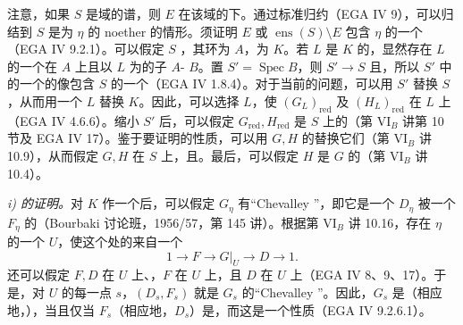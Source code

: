 注意，如果 $S$ 是域的谱，则 $E$ 在该域的下。通过标准归约（EGA IV 9），可以归结到 $S$ 是为 $\eta$ 的 noether 的情形。须证明 $E$ 或 $\operatorname{ens}(S)\setminus E$ 包含 $\eta$ 的一个（EGA IV 9.2.1）。可以假定 $S$ ，其环为 $A$，为 $K$。若 $L$ 是 $K$ 的，显然存在 $L$ 的一个在 $A$ 上且以 $L$ 为的子 $A$- $B$。置 $S'=\operatorname{Spec}B$，则 $S'\to S$ 且，所以 $S'$ 中的一个的像包含 $S$ 的一个（EGA IV 1.8.4）。对于当前的问题，可以用 $S'$ 替换 $S$，从而用一个 $L$ 替换 $K$。因此，可以选择 $L$，使 $(G_L)_{\mathrm{red}}$ 及 $(H_L)_{\mathrm{red}}$ 在 $L$ 上（EGA IV 4.6.6）。缩小 $S'$ 后，可以假定 $G_{\mathrm{red}},H_{\mathrm{red}}$ 是 $S$ 上的（第 VI$_B$ 讲第 10 节及 EGA IV 17）。鉴于要证明的性质，可以用 $G,H$ 的替换它们（第 VI$_B$ 讲 10.9），从而假定 $G,H$ 在 $S$ 上，且。最后，可以假定 $H$ 是 $G$ 的（第 VI$_B$ 讲 10.4）。

\emph{i) 的证明。}对 $K$ 作一个后，可以假定 $G_\eta$ 有“Chevalley ”，即它是一个 $D_\eta$ 被一个 $F_\eta$ 的（Bourbaki 讨论班，1956/57，第 145 讲）。根据第 VI$_B$ 讲 10.16，存在 $\eta$ 的一个 $U$，使这个处的来自一个
\[1\longrightarrow F\longrightarrow G|_U\longrightarrow D\longrightarrow1.\]
还可以假定 $F,D$ 在 $U$ 上、，$F$ 在 $U$ 上，且 $D$ 在 $U$ 上（EGA IV 8、9、17）。于是，对 $U$ 的每一点 $s$，$(D_s,F_s)$ 就是 $G_s$ 的“Chevalley ”。因此，$G_s$ 是（相应地，），当且仅当 $F_s$（相应地，$D_s$）是，而这是一个性质（EGA IV 9.2.6.1）。


